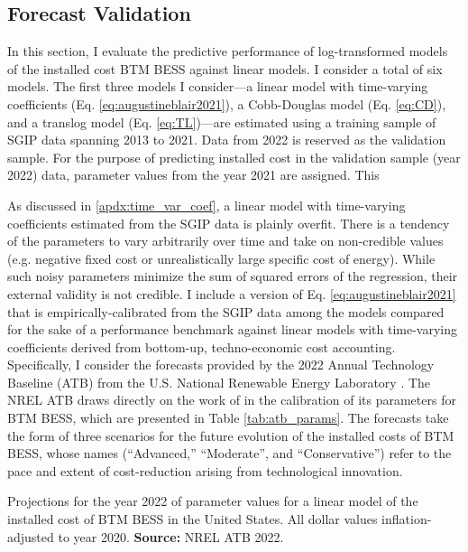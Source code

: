 \documentclass[preprint,12pt,authoryear]{elsarticle}
\begin{document}
\subsection{Forecast Validation}\label{sec:validation}

In this section, I evaluate the predictive performance of log-transformed models of the installed cost BTM BESS against linear models. I consider a total of six models. The first three models I consider---a linear model with time-varying coefficients (Eq. \ref{eq:augustineblair2021}), a Cobb-Douglas model (Eq. \ref{eq:CD}), and a translog model (Eq. \ref{eq:TL})---are estimated using a training sample of SGIP data spanning 2013 to 2021. Data from 2022 is reserved as the validation sample. For the purpose of predicting installed cost in the validation sample (year 2022) data, parameter values from the year 2021 are assigned. This 

As discussed in \ref{apdx:time_var_coef}, a linear model with time-varying coefficients estimated from the SGIP data is plainly overfit. There is a tendency of the parameters to vary arbitrarily over time and take on non-credible values (e.g. negative fixed cost or unrealistically large specific cost of energy). While such noisy parameters minimize the sum of squared errors of the regression, their external validity is not credible. I include a version of Eq. \ref{eq:augustineblair2021} that is empirically-calibrated from the SGIP data among the models compared for the sake of a performance benchmark against linear models with time-varying coefficients derived from bottom-up, techno-economic cost accounting. Specifically, I consider the forecasts provided by the 2022 Annual Technology Baseline (ATB) from the U.S. National Renewable Energy Laboratory . The NREL ATB draws directly on the work of \citet{augustineblair2021} in the calibration of its parameters for BTM BESS, which are presented in Table \ref{tab:atb_params}. The forecasts take the form of three scenarios for the future evolution of the installed costs of BTM BESS, whose names (``Advanced,'' ``Moderate'', and ``Conservative'') refer to the pace and extent of cost-reduction arising from technological innovation.

\begin{table}[t]
\centering

\caption{Projections for the year 2022 of parameter values for a linear model of the installed cost of BTM BESS in the United States. All dollar values inflation-adjusted to year 2020. \textbf{Source:} NREL ATB 2022.}\label{tab:atb_params}
\end{table}
\end{document}
